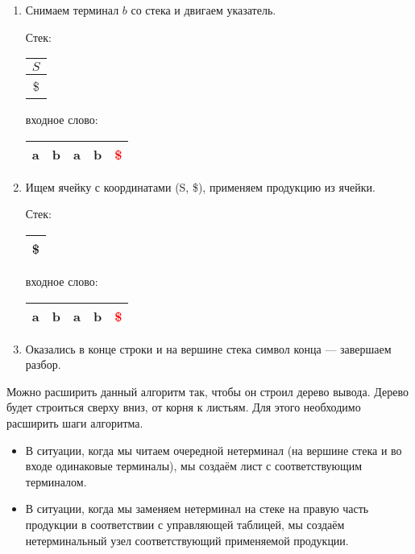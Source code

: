 \begin{example}
\begin{enumerate}
\item Снимаем терминал $b$ со стека и двигаем указатель.

    Стек: \,
    \begin{tabular}[c]{ |c| } 
        \\ \hline
        $S$ \\ \hline
        \$ \\ \hline
    \end{tabular}  
    \qquad  \qquad \qquad  \qquad входное слово: \,
    \begin{tabular}[c]{ |c|c|c|c|c| } 
        \hline
        a & b & a & b & \textcolor{red}{\$} \\ \hline
    \end{tabular}

\item Ищем ячейку с координатами (S, \$), применяем продукцию из ячейки.

    Стек: \,
    \begin{tabular}[c]{ |c| } 
        \\ \hline
        \$ \\ \hline
    \end{tabular}  
    \qquad  \qquad \qquad  \qquad входное слово: \,
    \begin{tabular}[c]{ |c|c|c|c|c| } 
        \hline
        a & b & a & b & \textcolor{red}{\$} \\ \hline
    \end{tabular}    
 
\item Оказались в конце строки и на вершине стека символ конца --- завершаем разбор.

\end{enumerate}

\end{example}

Можно расширить данный алгоритм так, чтобы он строил дерево вывода. Дерево будет строиться сверху вниз, от корня к листьям. Для этого необходимо расширить шаги алгоритма.
\begin{itemize}
  \item В ситуации, когда мы читаем очередной нетерминал (на вершине стека и во входе одинаковые терминалы), мы создаём лист с соответствующим терминалом.
  \item В ситуации, когда мы заменяем нетерминал на стеке на правую часть продукции в соответствии с управляющей таблицей, мы создаём нетерминальный узел соответствующий применяемой продукции.
\end{itemize} 

